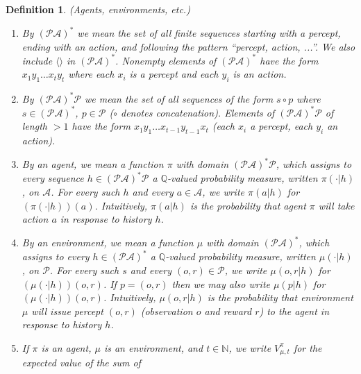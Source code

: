 \documentclass[twoside]{article}
\newtheorem{definition}[theorem]{Definition}
\begin{document}
\begin{definition}
\label{omnibusdefn}
    (Agents, environments, etc.)
    \begin{enumerate}
        \item
        By $(\mathcal P\mathcal A)^*$ we mean the set of
        all finite sequences
        starting with a percept, ending with an action,
        and following the pattern ``percept, action, ...''.
        We also include $\langle\rangle$ in $(\mathcal P\mathcal A)^*$.
        Nonempty elements of $(\mathcal P\mathcal A)^*$ have the
        form $x_1y_1\ldots x_ty_t$ where each $x_i$ is a percept and
        each $y_i$ is an action.
        \item
        By $(\mathcal P\mathcal A)^* \mathcal P$
        we mean the set of all sequences of the form $s\circ p$ where
        $s\in (\mathcal P\mathcal A)^*$, $p\in\mathcal P$
        ($\circ$ denotes concatenation).
        Elements of $(\mathcal P\mathcal A)^* \mathcal P$
        of length $>1$ have the form
        $x_1y_1\ldots x_{t-1}y_{t-1}x_t$
        (each $x_i$ a percept, each $y_i$ an action).
        \item
        By an \emph{agent}, we mean a function $\pi$
        with domain $(\mathcal P\mathcal A)^* \mathcal P$,
        which assigns to every sequence
        $h\in (\mathcal P\mathcal A)^* \mathcal P$ a
        $\mathbb Q$-valued probability measure,
        written $\pi(\cdot|h)$, on $\mathcal A$.
        For every such $h$ and every $a\in\mathcal A$,
        we write $\pi(a|h)$ for $(\pi(\cdot|h))(a)$.
        Intuitively, $\pi(a|h)$ is the probability that agent $\pi$
        will take action $a$ in response to history $h$.
        \item
        By an \emph{environment}, we mean a function $\mu$
        with domain $(\mathcal P\mathcal A)^*$,
        which assigns to every
        $h\in (\mathcal P\mathcal A)^*$
        a $\mathbb Q$-valued probability measure,
        written $\mu(\cdot|h)$,
        on $\mathcal P$.
        For every such $s$ and every $(o,r)\in\mathcal P$,
        we write $\mu(o,r|h)$ for $(\mu(\cdot|h))(o,r)$.
        If $p=(o,r)$ then we may also write $\mu(p|h)$ for
        $(\mu(\cdot|h))(o,r)$.
        Intuitively, $\mu(o,r|h)$ is the probability that environment
        $\mu$ will issue percept $(o,r)$ (observation $o$ and reward $r$)
        to the agent in response to history $h$.
        \item
        If $\pi$ is an agent, $\mu$ is an environment, and $t\in\mathbb N$,
        we write $V^\pi_{\mu,t}$ for the expected value of the sum of

\end{enumerate}
\end{definition}
\end{document}
